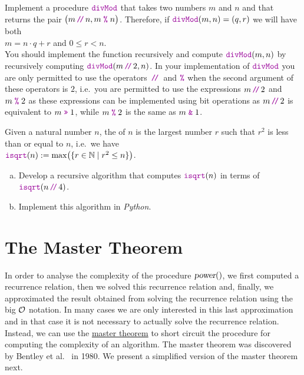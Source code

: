 \exercise
Implement a procedure $\mytt{divMod}$ that takes two numbers $m$ and $n$ and that returns the pair
$\bigl(m \dv n, m \;\mytt{\%}\; n\bigr)$.
Therefore, if $\mytt{divMod}(m, n) = (q,r)$ we will have both
\\[0.2cm]
\hspace*{1.3cm}
$m = n \cdot q + r$ \quad and \quad $0 \leq r < n$.
\\[0.2cm]
You should implement the function recursively and compute 
$\mytt{divMod}(m, n)$ by recursively computing $\mytt{divMod}(m \dv 2, n)$.
In your implementation of $\mytt{divMod}$ you are only permitted to use the operators $\dv$ and
$\mytt{\%}$ when the second argument of these operators is $2$, i.e.~you are permitted to
use the expressions $m \dv 2$ and $m \;\mytt{\%}\; 2$ as these expressions can be implemented
using bit operations as $m \dv 2$ is equivalent to $m \;\mytt{>>}\; 1$, while $m \;\mytt{\%}\; 2$
is the same as $m \;\mytt{\&}\; 1$.
\eoxs


\exercise
Given a natural number $n$, the   of $n$ is the largest
number $r$ such that $r^2$ is less than or equal to $n$, i.e.~we have
\\[0.2cm]
\hspace*{1.3cm}
$\mytt{isqrt}(n) := \max\bigl(\{ r \in \mathbb{N} \mid r^2 \leq n \}\bigr)$.
\begin{enumerate}[(a)]
\item Develop a recursive algorithm that computes $\mytt{isqrt}(n)$ in terms of $\mytt{isqrt}(n\dv4)$.
\item Implement this algorithm in \textsl{Python}. \eoxs
\end{enumerate}

\section{The Master Theorem}
In order to analyse the complexity of  the procedure $\textsl{power}()$,
we first computed a  recurrence relation, then we solved this recurrence relation and, finally,  
we approximated the result obtained from solving the recurrence relation using the big $\mathcal{O}$ notation.  In many
cases we are only interested in this last approximation and in that case it is not necessary to actually solve
the recurrence relation.   Instead, we can use the 
\href{http://en.wikipedia.org/wiki/Master_theorem#Generic_form}{master theorem} to short 
circuit the procedure for computing the complexity of an algorithm.   The master theorem was discovered by
Bentley et al.~\cite{bentley:1980} in 1980.
We present a simplified version of the master theorem next.

